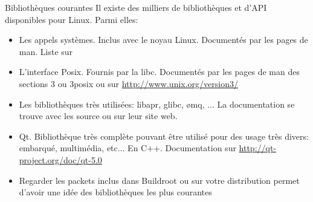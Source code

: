 \begin{frame}[fragile=singleslide]{Bibliothèques courantes}
  Il existe  des milliers de  bibliothèques et d'API  disponibles pour
  Linux. Parmi elles:
  \begin{itemize} 
  \item Les  appels systèmes. Inclus  avec le noyau  Linux. Documentés
    par les pages de man. Liste sur 
  \item L'interface  Posix.  Fournis par la libc.   Documentés par les
    pages    de   man   des    sections   3    ou   3posix    ou   sur
    \url{http://www.unix.org/version3/}
  \item Les bibliothèques très  utilisées: libapr, glibc, ømq, ...  La
    documentation se trouve avec les source ou sur leur site web.
  \item Qt.  Bibliothèque très complète pouvant être  utilisé pour des
    usage    très   divers:    embarqué,    multimédia,   etc...    En
    C++. Documentation sur \url{http://qt-project.org/doc/qt-5.0}
  \item  Regarder  les packets  inclus  dans  Buildroot  ou sur  votre
    distribution permet  d'avoir une  idée des bibliothèques  les plus
    courantes
  \end{itemize} 
\end{frame} 


